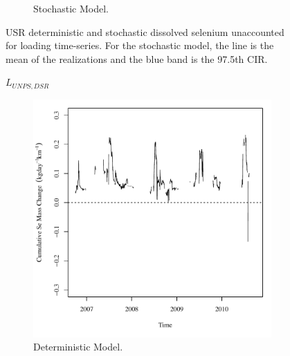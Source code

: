\begin{linenumbers}
\begin{landscape}
\begin{figure}
\begin{subfigure}{0.7\textwidth}
			\caption{Stochastic Model.}
		\end{subfigure}
		\caption[USR deterministic and stochastic dissolved selenium unaccounted for loading time-series.]{USR deterministic and stochastic dissolved selenium unaccounted for loading time-series.  For the stochastic model, the line is the mean of the realizations and the blue band is the 97.5th CIR.}
		\label{fig:USRMass}
	\end{figure}
\end{landscape}
\subfiguretop
\begin{landscape}
	\begin{figure}
		$ \displaystyle L_{UNPS,DSR} $
		\begin{subfigure}{0.7\textwidth}
			\centering
			\includegraphics[width=\tableCustomSize]{"Figures/Results_DSR/Deterministic/Balance Mass"}
			\caption{Deterministic Model.}
		\end{subfigure}%
		\begin{subfigure}{0.7\textwidth}
			\centering

\end{subfigure}
\end{figure}
\end{landscape}
\end{linenumbers}
